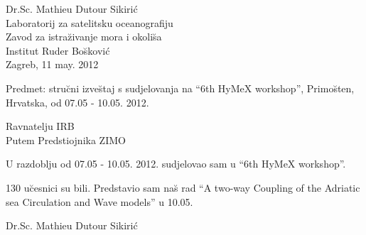 \documentclass[12pt]{article}
\author{Mathieu Dutour}
\begin{document}
\newcommand{\R}{\ensuremath{\Bbb{R}}}
\newcommand{\N}{\ensuremath{\Bbb{N}}}
\newcommand{\Q}{\ensuremath{\Bbb{Q}}}
\newcommand{\C}{\ensuremath{\Bbb{C}}}
\newcommand{\Z}{\ensuremath{\Bbb{Z}}}
\newcommand{\T}{\ensuremath{\Bbb{T}}}

\begin{flushleft}
Dr.Sc. Mathieu Dutour Sikiri\'c\\
Laboratorij za satelitsku oceanografiju\\
Zavod za istra\u zivanje mora i okoli\u sa\\
Institut Ruder Bo\u skovi\'c\\[5mm]
Zagreb, 11 may. 2012
\end{flushleft}
\begin{center}
Predmet: stru\u cni izve\u staj s sudjelovanja na ``6th HyMeX workshop'', 
Primo\u sten, Hrvatska, od 07.05 - 10.05. 2012.
\end{center}


\begin{flushright}
Ravnatelju IRB\\
Putem Predstiojnika ZIMO
\end{flushright}


U razdoblju od 07.05 - 10.05. 2012. sudjelovao sam u ``6th HyMeX workshop''.

130 u\u cesnici su bili.
Predstavio sam na\u s rad ``A two-way Coupling of the Adriatic sea Circulation and Wave models'' u 10.05.

\begin{center}
Dr.Sc. Mathieu Dutour Sikiri\'c
\end{center}
\end{document}
